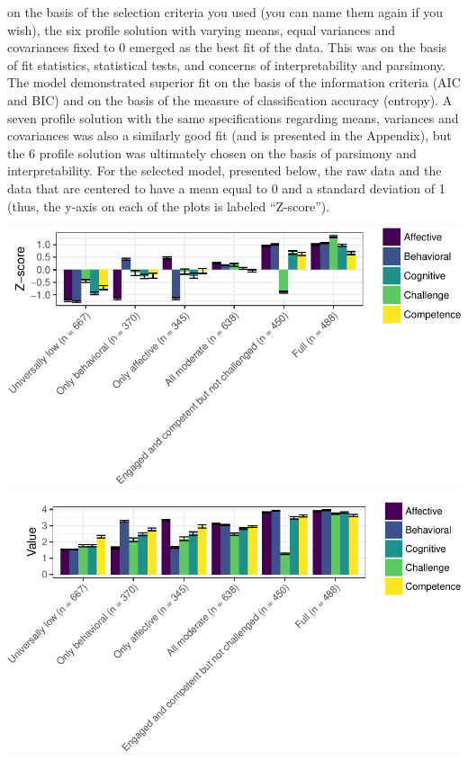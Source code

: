 \documentclass[]{msu-thesis}
\theoremstyle{definition}
\theoremstyle{definition}
\theoremstyle{definition}
\theoremstyle{remark}
\begin{document}
on the basis of the selection criteria you used (you can name them again
if you wish), the six profile solution with varying means, equal
variances and covariances fixed to 0 emerged as the best fit of the
data. This was on the basis of fit statistics, statistical tests, and
concerns of interpretability and parsimony. The model demonstrated
superior fit on the basis of the information criteria (AIC and BIC) and
on the basis of the measure of classification accuracy (entropy). A
seven profile solution with the same specifications regarding means,
variances and covariances was also a similarly good fit (and is
presented in the Appendix), but the 6 profile solution was ultimately
chosen on the basis of parsimony and interpretability. For the selected
model, presented below, the raw data and the data that are centered to
have a mean equal to 0 and a standard deviation of 1 (thus, the y-axis
on each of the plots is labeled ``Z-score'').

\begin{center}\includegraphics[width=0.8\linewidth]{rosenberg-dissertation_files/figure-latex/unnamed-chunk-11-1} \end{center}

\begin{center}\includegraphics[width=0.8\linewidth]{rosenberg-dissertation_files/figure-latex/unnamed-chunk-11-2} \end{center}
\end{document}
